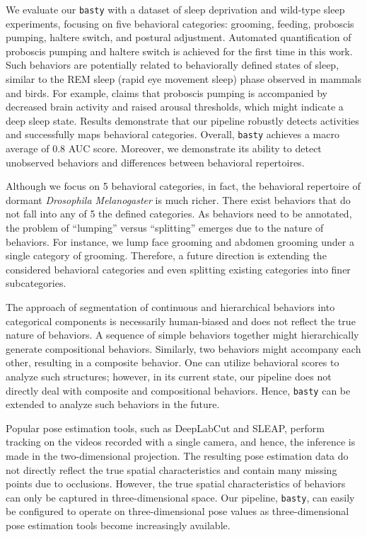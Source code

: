 We evaluate our \texttt{basty} with a dataset of sleep deprivation and wild-type sleep experiments, focusing on five behavioral categories: grooming, feeding, proboscis pumping, haltere switch, and postural adjustment.
Automated quantification of proboscis pumping and haltere switch is achieved for the first time in this work.
Such behaviors are potentially related to behaviorally defined states of sleep, similar to the REM sleep (rapid eye movement sleep) phase observed in mammals and birds.
For example, \citet{van_alphen_deep_2021} claims that proboscis pumping is accompanied by decreased brain activity and raised arousal thresholds, which might indicate a deep sleep state.
Results demonstrate that our pipeline robustly detects activities and successfully maps behavioral categories.
Overall, \texttt{basty} achieves a macro average of 0.8 AUC score.
Moreover, we demonstrate its ability to detect unobserved behaviors and differences between behavioral repertoires.

Although we focus on 5 behavioral categories, in fact, the behavioral repertoire of dormant \textit{Drosophila Melanogaster} is much richer. There exist behaviors that do not fall into any of 5 the defined categories.
As behaviors need to be annotated, the problem of ``lumping'' versus ``splitting'' emerges due to the nature of behaviors. For instance, we lump face grooming and abdomen grooming under a single category of grooming.
Therefore, a future direction is extending the considered behavioral categories and even splitting existing categories into finer subcategories.

The approach of segmentation of continuous and hierarchical behaviors into categorical components is necessarily human-biased and does not reflect the true nature of behaviors.
A sequence of simple behaviors together might hierarchically generate compositional behaviors.
Similarly, two behaviors might accompany each other, resulting in a composite behavior.
One can utilize behavioral scores to analyze such structures; however, in its current state, our pipeline does not directly deal with composite and compositional behaviors.
Hence, \texttt{basty} can be extended to analyze such behaviors in the future.

Popular pose estimation tools, such as DeepLabCut and SLEAP, perform tracking on the videos recorded with a single camera, and hence, the inference is made in the two-dimensional projection.
The resulting pose estimation data do not directly reflect the true spatial characteristics and contain many missing points due to occlusions.
However, the true spatial characteristics of behaviors can only be captured in three-dimensional space.
Our pipeline, \texttt{basty}, can easily be configured to operate on three-dimensional pose values as three-dimensional pose estimation tools become  increasingly available.
